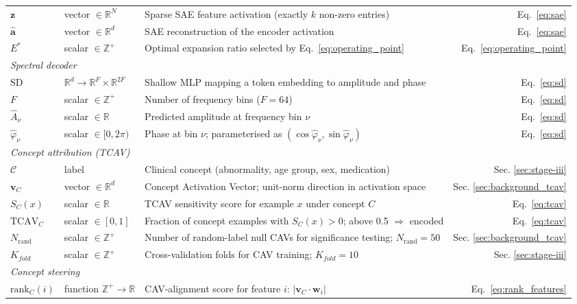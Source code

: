 \documentclass{article}
\begin{document}
\begin{table}[h]
\begin{tabular}{lllr}
$\mathbf{z}$ & vector $\in \mathbb{R}^N$ & Sparse SAE feature activation (exactly $k$ non-zero entries) & Eq.~\ref{eq:sae} \\
$\hat{\mathbf{a}}$ & vector $\in \mathbb{R}^d$ & SAE reconstruction of the encoder activation & Eq.~\ref{eq:sae} \\
$E^*$ & scalar $\in \mathbb{Z}^+$ & Optimal expansion ratio selected by Eq.~\ref{eq:operating_point} & Eq.~\ref{eq:operating_point} \\
\midrule
\multicolumn{4}{l}{\textit{Spectral decoder}} \\
$\mathrm{SD}$ & $\mathbb{R}^d \!\to\! \mathbb{R}^F \!\times\! \mathbb{R}^{2F}$ & Shallow MLP mapping a token embedding to amplitude and phase & Eq.~\ref{eq:sd} \\
$F$ & scalar $\in \mathbb{Z}^+$ & Number of frequency bins ($F = 64$) & Eq.~\ref{eq:sd} \\
$\hat{A}_\nu$ & scalar $\in \mathbb{R}$ & Predicted amplitude at frequency bin $\nu$ & Eq.~\ref{eq:sd} \\
$\hat{\varphi}_\nu$ & scalar $\in [0,2\pi)$ & Phase at bin $\nu$; parameterised as $(\cos\hat{\varphi}_\nu, \sin\hat{\varphi}_\nu)$ & Eq.~\ref{eq:sd} \\
\midrule
\multicolumn{4}{l}{\textit{Concept attribution (TCAV)}} \\
$\mathcal{C}$ & label & Clinical concept (abnormality, age group, sex, medication) & Sec. \ref{sec:stage-iii} \\
$\mathbf{v}_C$ & vector $\in \mathbb{R}^d$ & Concept Activation Vector; unit-norm direction in activation space & Sec. \ref{sec:background_tcav} \\
$S_C(x)$ & scalar $\in \mathbb{R}$ & TCAV sensitivity score for example $x$ under concept $C$ & Eq.~\ref{eq:tcav} \\
$\mathrm{TCAV}_C$ & scalar $\in [0,1]$ & Fraction of concept examples with $S_C(x)>0$; above 0.5 $\Rightarrow$ encoded & Eq.~\ref{eq:tcav} \\
$N_{\text{rand}}$ & scalar $\in \mathbb{Z}^+$ & Number of random-label null CAVs for significance testing; $N_{\text{rand}}=50$ & Sec. \ref{sec:background_tcav}  \\
$K_{fold}$ & scalar $\in \mathbb{Z}^+$ & Cross-validation folds for CAV training; $K_{fold}=10$ & Sec. \ref{sec:stage-iii} \\
\midrule
\multicolumn{4}{l}{\textit{Concept steering}} \\
$\mathrm{rank}_C(i)$ & function $\mathbb{Z}^+\!\to\!\mathbb{R}$ & CAV-alignment score for feature $i$: $|\mathbf{v}_C \cdot \mathbf{w}_i|$ & Eq.~\ref{eq:rank_features} \\

\end{tabular}
\end{table}
\end{document}
